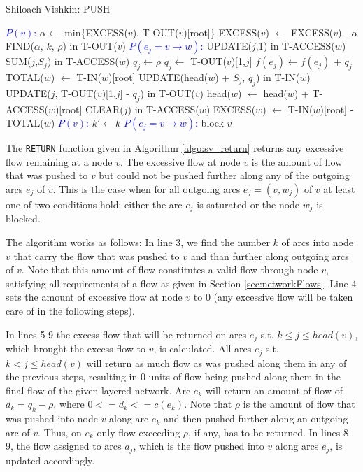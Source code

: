 \documentclass[a4paper,10pt, twocolumn]{article}
\begin{document}
\begin{algorithm}
\caption{Shiloach-Vishkin: PUSH}
\label{algo:sv_push}
\begin{algorithmic}[1]
		\State \textcolor{blue}{$P(v)$:}
		\State $\alpha \gets$ min\{EXCESS($v$), T-OUT($v$)[root]\} 
		\State EXCESS($v$) $\gets$ EXCESS($v$) - $\alpha$
		\State FIND($\alpha$, $k$, $\rho$) in T-OUT($v$)
		\State \textcolor{blue}{$P(e_j = v \rightarrow w)$:}
 		\State UPDATE($j$,1) in T-ACCESS($w$)
		\State SUM($j$,$S_j$) in T-ACCESS($w$)
			$q_j \gets \rho$
		\Else
			\State $q_j\gets$ T-OUT($v$)[1,$j$]
		\EndIf
		\State $f(e_j) \gets f(e_j)$ + $q_j$
		\State TOTAL($w$) $\gets$ T-IN($w$)[root]
		\State UPDATE(head($w$) + $S_j$, $q_j$) in T-IN($w$)
		\State UPDATE($j$, T-OUT($v$)[1,$j$] - $q_j$) in T-OUT($v$)
		\State head($w$) $\gets$ head($w$) + T-ACCESS($w$)[root] 
		\State CLEAR($j$) in T-ACCESS($w$)
		\State EXCESS($w$) $\gets$ T-IN($w$)[root] - TOTAL($w$)
		\EndIf
		\State \textcolor{blue}{$P(v)$:} $k' \gets k$
		\State \textcolor{blue}{$P(e_j = v \rightarrow w)$:}
			\State block $v$
		\EndIf
 	\EndFunction
\end{algorithmic}
\end{algorithm}

The \lstinline|RETURN| function given in Algorithm \ref{algo:sv_return} returns any excessive flow remaining at a node $v$. The excessive flow at node $v$ is the amount of flow that was pushed to $v$ but could not be pushed further along any of the outgoing arcs $e_j$ of $v$. This is the case when for all outgoing arcs $e_j = (v ,w_j)$ of $v$ at least one of two conditions hold: either the arc $e_j$ is saturated or the node $w_j$ is blocked. 

The algorithm works as follows: In line 3, we find the number $k$ of arcs into node $v$ that carry the flow that was pushed to $v$ and than further along outgoing arcs of $v$. Note that this amount of flow constitutes a valid flow through node $v$, satisfying all requirements of a flow as given in Section \ref{sec:networkFlows}. Line 4 sets the amount of excessive flow at node $v$ to 0 (any excessive flow will be taken care of in the following steps).

In lines 5-9 the excess flow that will be returned on arcs $e_j$ s.t. $k \leq j \leq head(v)$, which brought the excess flow to $v$, is calculated. All arcs $e_j$ s.t. $k<j \leq head(v)$ will return as much flow as was pushed along them in any of the previous steps, resulting in 0 units of flow being pushed along them in the final flow of the given layered network. Arc $e_k$ will return an amount of flow of $d_k = q_k - \rho$, where $0 <= d_k <= c(e_k)$. Note that $\rho$ is the amount of flow that was pushed into node $v$ along arc $e_k$ and then pushed further along an outgoing arc of $v$. Thus, on $e_k$ only flow exceeding $\rho$, if any, has to be returned. In lines 8-9, the flow assigned to arcs $a_j$, which is the flow pushed into $v$ along arcs $e_j$, is updated accordingly.
\end{document}
